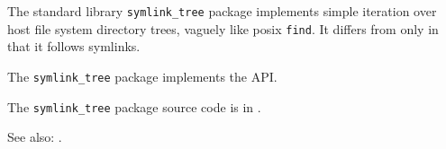 
The standard library {\tt symlink\_tree} package implements simple iteration 
over host file system directory trees, vaguely like posix {\tt find}.  It 
differs from  only in that it follows 
symlinks.

The {\tt symlink\_tree} package implements the  API.

The {\tt symlink\_tree} package source code is in .

See also:   .

